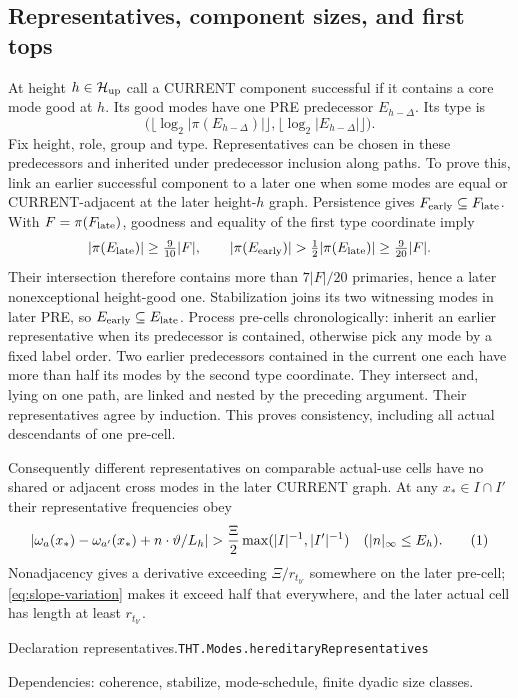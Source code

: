 \documentclass[11pt]{article}
\theoremstyle{definition}
\newcommand{\eqtag}[1]{\refstepcounter{equation}\tag{\theequation}\label{#1}}
\numberwithin{equation}{section}
\newcommand{\bp}[3]{\par\smallskip\begingroup\footnotesize
\noindent\hypertarget{bp:#1}{\textsf{Declaration #1.}}\quad\nolinkurl{#2}\par
\noindent\textsf{Dependencies:} #3.\par\endgroup\smallskip}
\begin{document}
\subsection{Representatives, component sizes, and first tops}
At height $h\in\mathcal H_{\rm up}$ call a CURRENT component successful if it contains a core mode good at $h$. Its good modes have one PRE predecessor $E_{h-\Delta}$. Its type is
\[
 \bigl(\lfloor\log_2|\pi(E_{h-\Delta})|\rfloor,
       \lfloor\log_2|E_{h-\Delta}|\rfloor\bigr).
\]
Fix height, role, group and type. Representatives can be chosen in these predecessors and inherited under predecessor inclusion along paths. To prove this, link an earlier successful component to a later one when some modes are equal or CURRENT-adjacent at the later height-$h$ graph. Persistence gives $F_{\rm early}\subseteq F_{\rm late}$. With $F=\pi(F_{\rm late})$, goodness and equality of the first type coordinate imply
\[
 |\pi(E_{\rm late})|\ge\tfrac9{10}|F|,
 \qquad |\pi(E_{\rm early})|>\tfrac12|\pi(E_{\rm late})|
 \ge\tfrac9{20}|F|.
\]
Their intersection therefore contains more than $7|F|/20$ primaries, hence a later nonexceptional height-good one. Stabilization joins its two witnessing modes in later PRE, so $E_{\rm early}\subseteq E_{\rm late}$. Process pre-cells chronologically: inherit an earlier representative when its predecessor is contained, otherwise pick any mode by a fixed label order. Two earlier predecessors contained in the current one each have more than half its modes by the second type coordinate. They intersect and, lying on one path, are linked and nested by the preceding argument. Their representatives agree by induction. This proves consistency, including all actual descendants of one pre-cell.

Consequently different representatives on comparable actual-use cells have no shared or adjacent cross modes in the later CURRENT graph. At any $x_*\in I\cap I'$ their representative frequencies obey
\[
 |\omega_a(x_*)-\omega_{a'}(x_*)+n\cdot\vartheta/L_h|
 >\frac\Xi2\max(|I|^{-1},|I'|^{-1})
 \quad(|n|_\infty\le E_h).
 \eqtag{eq:representative-separation}
\]
Nonadjacency gives a derivative exceeding $\Xi/r_{t_{b'}}$ somewhere on the later pre-cell; \eqref{eq:slope-variation} makes it exceed half that everywhere, and the later actual cell has length at least $r_{t_{b'}}$.

\bp{representatives}{THT.Modes.hereditaryRepresentatives}{coherence, stabilize, mode-schedule, finite dyadic size classes}
\end{document}
